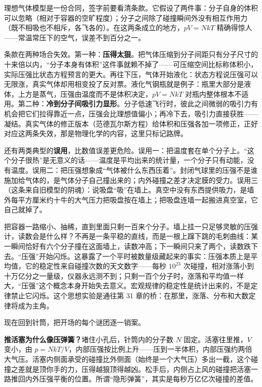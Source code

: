 
理想气体模型是一份合同，签字前要看清条款。它假设了两件事：分子自身的体积可以忽略（相对于容器的空旷程度）；分子之间除了碰撞瞬间外没有相互作用力（既不相吸也不相斥，各飞各的）。在这两条成立的地方，\(pV=NkT\) 精确得惊人——常温常压下的空气，误差不到百分之一。

条款在两种场合失效。第一种：\textbf{压得太狠}。把气体压缩到分子间距只有分子尺寸的十来倍以内，“分子本身有体积”这件事就赖不掉了——可压缩空间比标称体积小，实际压强比状态方程预言的更大。再往下压，气体开始液化：状态方程说压强可以无限涨，真实气体却用相变投了反对票。液化气钢瓶就是例子：瓶里大部分是液体，上方是蒸气，压强由温度而不是体积决定，\(pV=NkT\) 对瓶内整体根本不适用。第二种：\textbf{冷到分子间吸引力显形}。分子低速飞行时，彼此之间微弱的吸引力有机会把它们拉得靠近一点，压强会比理想值偏小；再冷下去，吸引力直接获胜——凝结。真实气体的修正版本（范德瓦尔斯方程）给体积和压强各加一项修正，正好对应这两条失效，那是物理化学的内容，这里只标记路牌。

还有两类典型的\textbf{误用}，比数值误差更危险。误用一：把温度套在单个分子上。“这个分子很热”是无意义的话——温度是平均出来的统计量，一个分子只有动能，没有温度。误用二：把压强想象成“气体被什么东西压着”。封闭气球里的压强不是谁施加给气体的，是气体分子自己撞出来的；内外碰撞之差才决定膜的受力。误用三（这条来自旧模型的阴魂）：说吸盘“吸”在墙上。真空中没有东西提供吸力，是墙外每平方厘米约十牛的大气压力把吸盘按在墙上；把吸盘连墙一起搬进真空室，它自己就掉了。

\begin{thought}
把容器一路缩小、抽稀，直到里面只剩一百来个分子。墙上挂一只足够灵敏的压强计，读数会是什么样？不再是一条平稳的直线，而是一根上蹿下跳的毛刺曲线：某一瞬间恰好有六个分子撞在这面墙上，读数冲高；下一瞬间只来了两个，读数跌下去。“压强”开始闪烁。这暴露了一个平时被数量级藏起来的事实：压强本质上是平均值，它的稳定性来自碰撞次数的天文数字——每秒 \(10^{23}\) 次碰撞，相对涨落小到十万亿分之一量级，仪器永远测不到；只剩一百个分子时，涨落和平均值一样大，“压强”这个概念本身开始失去意义。宏观规律的稳定性是统计出来的，不是定律禁止它闪烁。这个思想实验是通往第 31 章的桥：在那里，涨落、分布和大数定律将成为主角。
\end{thought}


现在回到针筒，把开场的每个谜团逐一销案。

\textbf{推活塞为什么像压弹簧？}堵住小孔后，针筒内的分子数 \(N\) 固定。活塞往里推，\(V\) 变小，由 \(p=NkT/V\)，内部压强按比例上升——压到一半体积，内部压强约两倍大气压。活塞内侧面承受的碰撞比外侧面（始终是一个大气压）多出一截，这个碰撞之差就是顶你手的力，压得越狠顶得越凶。松手后，内侧占上风的碰撞把活塞一路推回内外压强平衡的位置。所谓“隐形弹簧”，其实是每秒万亿亿次碰撞的差值。

